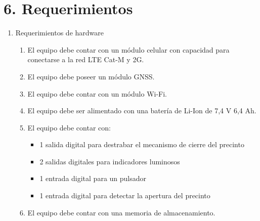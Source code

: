 \documentclass[
11pt, %
]{charter}
\begin{document}
\section{6. Requerimientos}
\label{sec:requerimientos}

\begin{enumerate}
	\item Requerimientos de hardware
		\begin{enumerate}
			\item El equipo debe contar con un módulo celular con capacidad para conectarse a la red LTE Cat-M y 2G.
			\item El equipo debe poseer un módulo GNSS.
			\item El equipo debe contar con un módulo Wi-Fi.
			\item El equipo debe ser alimentado con una batería de Li-Ion de 7,4 V 6,4 Ah.		
			\item El equipo debe contar con:
			\begin{itemize}
				\item 1 salida digital para destrabar el mecanismo de cierre del precinto 
				\item 2 salidas digitales para indicadores luminosos
				\item 1 entrada digital para un pulsador
				\item 1 entrada digital para detectar la apertura del precinto
			\end{itemize}
			\item El equipo debe contar con una memoria de almacenamiento.

			
			
		\end{enumerate}
		

\end{enumerate}
\end{document}
